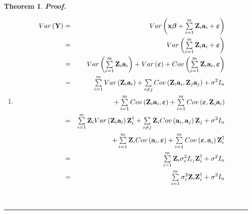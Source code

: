 \documentclass{article}
\newtheorem{theorem}{Theorem}
\newenvironment{proof}[1][Proof]{\noindent\textbf{#1.} }{\ \rule{0.5em}{0.5em}}
\begin{document}
\begin{theorem}
\begin{proof}
\begin{enumerate}
\item 
\begin{eqnarray*}
Var\left( \mathbf{Y}\right) &=&Var\left( \mathbf{x\beta }+\tsum%
\limits_{i=1}^{m}\mathbf{Z}_{i}\mathbf{a}_{i}+\mathbf{\varepsilon }\right) \\
&=&Var\left( \tsum\limits_{i=1}^{m}\mathbf{Z}_{i}\mathbf{a}_{i}+\mathbf{%
\varepsilon }\right) \\
&=&Var\left( \tsum\limits_{i=1}^{m}\mathbf{Z}_{i}\mathbf{a}_{i}\right)
+Var\left( \mathbf{\varepsilon }\right) +Cov\left( \tsum\limits_{i=1}^{m}%
\mathbf{Z}_{i}\mathbf{a}_{i},\mathbf{\varepsilon }\right) \\
&=&\tsum\limits_{i=1}^{m}Var\left( \mathbf{Z}_{i}\mathbf{a}_{i}\right)
+\tsum\limits_{i\neq j}Cov\left( \mathbf{Z}_{i}\mathbf{a}_{i},\mathbf{Z}_{j}%
\mathbf{a}_{j}\right) +\sigma ^{2}I_{n} \\
&&+\tsum\limits_{i=1}^{m}Cov\left( \mathbf{Z}_{i}\mathbf{a}_{i},\mathbf{%
\varepsilon }\right) +\tsum\limits_{i=1}^{m}Cov\left( \mathbf{\varepsilon ,Z}%
_{i}\mathbf{a}_{i}\right) \\
&=&\tsum\limits_{i=1}^{m}\mathbf{Z}_{i}Var\left( \mathbf{Z}_{i}\mathbf{a}%
_{i}\right) \mathbf{Z}_{i}^{\dagger }+\tsum\limits_{i\neq j}\mathbf{Z}%
_{i}Cov\left( \mathbf{a}_{i},\mathbf{a}_{j}\right) \mathbf{Z}_{j}+\sigma
^{2}I_{n} \\
&&+\tsum\limits_{i=1}^{m}\mathbf{Z}_{i}Cov\left( \mathbf{a}_{i},\mathbf{%
\varepsilon }\right) +\tsum\limits_{i=1}^{m}Cov\left( \mathbf{\varepsilon ,a}%
_{i}\right) \mathbf{Z}_{i}^{\dagger } \\
&=&\tsum\limits_{i=1}^{m}\mathbf{Z}_{i}\sigma _{i}^{2}I_{r_{i}}\mathbf{Z}%
_{i}^{\dagger }+\sigma ^{2}I_{n} \\
&=&\tsum\limits_{i=1}^{m}\sigma _{i}^{2}\mathbf{Z}_{i}\mathbf{Z}%
_{i}^{\dagger }+\sigma ^{2}I_{n}
\end{eqnarray*}
\end{enumerate}
\end{proof}
\end{theorem}

\bigskip
\end{document}
